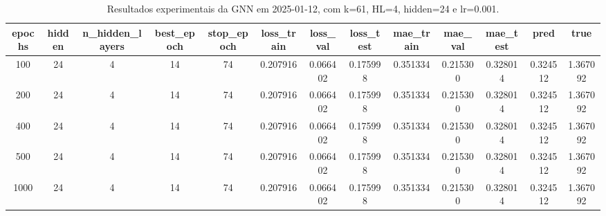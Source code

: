 \begin{table}[h]
\centering
\caption{Resultados experimentais da GNN em 2025-01-12, com k=61, HL=4, hidden=24 e lr=0.001.}
\label{tab:gnn_results_k61_hl4_h24_d20250112}
\begin{tabular}{ccccccccccccc}
\toprule
epochs & hidden & n\_hidden\_layers & best\_epoch & stop\_epoch & loss\_train & loss\_val & loss\_test & mae\_train & mae\_val & mae\_test & pred & true \\
\midrule
100 & 24 & 4 & 14 & 74 & 0.207916 & 0.066402 & 0.175998 & 0.351334 & 0.215300 & 0.328014 & 0.324512 & 1.367092 \\
200 & 24 & 4 & 14 & 74 & 0.207916 & 0.066402 & 0.175998 & 0.351334 & 0.215300 & 0.328014 & 0.324512 & 1.367092 \\
400 & 24 & 4 & 14 & 74 & 0.207916 & 0.066402 & 0.175998 & 0.351334 & 0.215300 & 0.328014 & 0.324512 & 1.367092 \\
500 & 24 & 4 & 14 & 74 & 0.207916 & 0.066402 & 0.175998 & 0.351334 & 0.215300 & 0.328014 & 0.324512 & 1.367092 \\
1000 & 24 & 4 & 14 & 74 & 0.207916 & 0.066402 & 0.175998 & 0.351334 & 0.215300 & 0.328014 & 0.324512 & 1.367092 \\
\bottomrule
\end{tabular}
\end{table}
